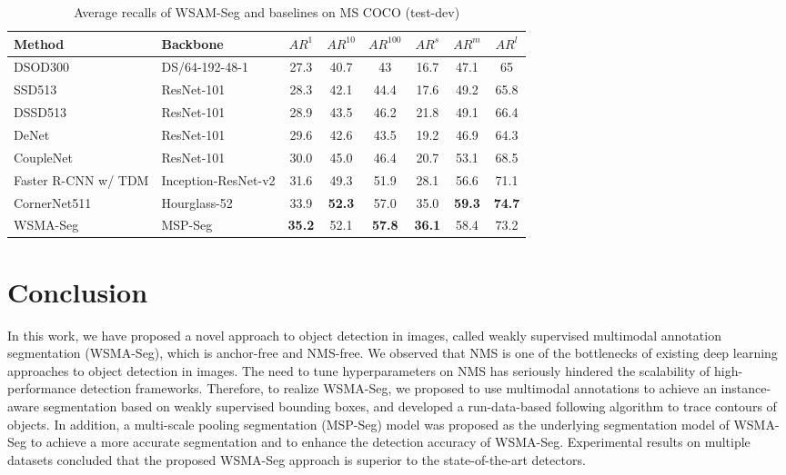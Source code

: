 \documentclass{article}
\begin{document}
\begin{table*}[!ht]
   \centering
   \vspace{-0.5em}
	\caption{Average recalls of WSAM-Seg and baselines on MS COCO (test-dev)\label{coco_recall}}
\begin{small}
   \begin{tabular}{|l|l|c|c|c|c|c|c|}
   \hline
   Method&Backbone& $AR^{1}$& $AR^{10}$& $AR^{100}$&$AR^{s}$& $AR^{m}$& $AR^{l}$ \\\hline
   DSOD300&DS/64-192-48-1&27.3&40.7&43&16.7&47.1&65\\\hline
   SSD513&ResNet-101&28.3&42.1&44.4&17.6&49.2&65.8\\\hline
   DSSD513&ResNet-101&28.9&43.5&46.2&21.8&49.1&66.4\\\hline
   DeNet&ResNet-101&29.6&42.6&43.5&19.2&46.9&64.3\\\hline
   CoupleNet&ResNet-101&30.0&45.0&46.4&20.7&53.1&68.5\\\hline
   Faster R-CNN w/ TDM&Inception-ResNet-v2&31.6&49.3&51.9&28.1&56.6&71.1\\\hline
   CornerNet511&Hourglass-52&33.9&\textbf{52.3}&57.0&35.0&\textbf{59.3}&\textbf{74.7}\\\hline
   WSMA-Seg&MSP-Seg&\textbf{35.2}&52.1&\textbf{57.8}&\textbf{36.1}&58.4&73.2\\\hline
  \end{tabular}\end{small}
\end{table*}
	
\section{Conclusion}
In this work, we have proposed a novel approach to object detection in images, called weakly su\-per\-vised multimodal annotation segmentation (WSMA-Seg), which is anchor-free and NMS-free. We observed that  NMS is one of the bottlenecks of existing deep learning 
approaches to object detection in images. The need to tune hyperparameters on NMS has seriously hindered the scalability of high-performance detection frameworks. Therefore, to realize WSMA-Seg, we proposed to use multimodal annotations to achieve an instance-aware segmentation based on weakly supervised bounding boxes, and developed a run-data-based following algorithm to trace contours of objects. In addition, a multi-scale pooling segmentation (MSP-Seg) model was proposed as the underlying segmentation model of WSMA-Seg to achieve a more accurate segmentation and to enhance the detection accuracy of WSMA-Seg. Experimental results on multiple datasets concluded that the proposed WSMA-Seg approach is superior to the state-of-the-art detectors.
{\small


}
\end{document}
